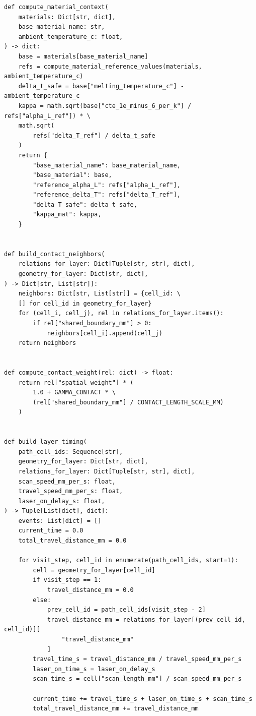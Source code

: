 \documentclass[a4paper, 12pt]{ctexart}
\begin{document}
\begin{verbatim}
def compute_material_context(
    materials: Dict[str, dict],
    base_material_name: str,
    ambient_temperature_c: float,
) -> dict:
    base = materials[base_material_name]
    refs = compute_material_reference_values(materials, ambient_temperature_c)
    delta_t_safe = base["melting_temperature_c"] - ambient_temperature_c
    kappa = math.sqrt(base["cte_1e_minus_6_per_k"] / refs["alpha_L_ref"]) * \
    math.sqrt(
        refs["delta_T_ref"] / delta_t_safe
    )
    return {
        "base_material_name": base_material_name,
        "base_material": base,
        "reference_alpha_L": refs["alpha_L_ref"],
        "reference_delta_T": refs["delta_T_ref"],
        "delta_T_safe": delta_t_safe,
        "kappa_mat": kappa,
    }


def build_contact_neighbors(
    relations_for_layer: Dict[Tuple[str, str], dict],
    geometry_for_layer: Dict[str, dict],
) -> Dict[str, List[str]]:
    neighbors: Dict[str, List[str]] = {cell_id: \
    [] for cell_id in geometry_for_layer}
    for (cell_i, cell_j), rel in relations_for_layer.items():
        if rel["shared_boundary_mm"] > 0:
            neighbors[cell_i].append(cell_j)
    return neighbors


def compute_contact_weight(rel: dict) -> float:
    return rel["spatial_weight"] * (
        1.0 + GAMMA_CONTACT * \
        (rel["shared_boundary_mm"] / CONTACT_LENGTH_SCALE_MM)
    )


def build_layer_timing(
    path_cell_ids: Sequence[str],
    geometry_for_layer: Dict[str, dict],
    relations_for_layer: Dict[Tuple[str, str], dict],
    scan_speed_mm_per_s: float,
    travel_speed_mm_per_s: float,
    laser_on_delay_s: float,
) -> Tuple[List[dict], dict]:
    events: List[dict] = []
    current_time = 0.0
    total_travel_distance_mm = 0.0

    for visit_step, cell_id in enumerate(path_cell_ids, start=1):
        cell = geometry_for_layer[cell_id]
        if visit_step == 1:
            travel_distance_mm = 0.0
        else:
            prev_cell_id = path_cell_ids[visit_step - 2]
            travel_distance_mm = relations_for_layer[(prev_cell_id, cell_id)][
                "travel_distance_mm"
            ]
        travel_time_s = travel_distance_mm / travel_speed_mm_per_s
        laser_on_time_s = laser_on_delay_s
        scan_time_s = cell["scan_length_mm"] / scan_speed_mm_per_s

        current_time += travel_time_s + laser_on_time_s + scan_time_s
        total_travel_distance_mm += travel_distance_mm


\end{verbatim}
\end{document}
